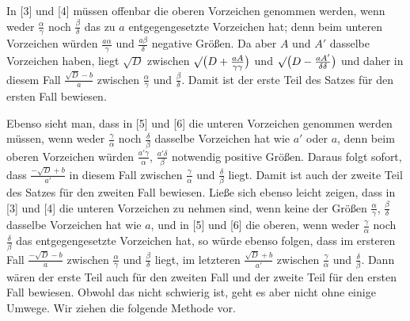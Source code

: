 In [3] und [4] müssen offenbar die oberen Vorzeichen genommen werden, wenn weder $\frac{\alpha}{\gamma}$ noch $\frac{\beta}{\delta}$ das zu $a$ entgegengesetzte Vorzeichen hat; denn beim unteren Vorzeichen würden $\frac{a\alpha}{\gamma}$ und $\frac{a\beta}{\delta}$ negative Größen. Da aber $A$ und $A'$ dasselbe Vorzeichen haben, liegt $\surd D$ zwischen $\surd\bigl(D+\frac{aA}{\gamma\gamma}\bigr)$ und $\surd\bigl(D-\frac{aA'}{\delta\delta}\bigr)$ und daher in diesem Fall $\frac{\surd D-b}{a}$ zwischen $\frac{\alpha}{\gamma}$ und $\frac{\beta}{\delta}$. Damit ist der erste Teil des Satzes für den ersten Fall bewiesen.

Ebenso sieht man, dass in [5] und [6] die unteren Vorzeichen genommen werden müssen, wenn weder $\frac{\gamma}{\alpha}$ noch $\frac{\delta}{\beta}$ dasselbe Vorzeichen hat wie $a'$ oder $a$, denn beim oberen Vorzeichen würden $\frac{a'\gamma}{\alpha}$, $\frac{a'\delta}{\beta}$ notwendig positive Größen. Daraus folgt sofort, dass $\frac{-\surd D+b}{a'}$ in diesem Fall zwischen $\frac{\gamma}{\alpha}$ und $\frac{\delta}{\beta}$ liegt. Damit ist auch der zweite Teil des Satzes für den zweiten Fall bewiesen. Ließe sich ebenso leicht zeigen, dass in [3] und [4] die unteren Vorzeichen zu nehmen sind, wenn keine der Größen $\frac{\alpha}{\gamma}$, $\frac{\beta}{\delta}$ dasselbe Vorzeichen hat wie $a$, und in [5] und [6] die oberen, wenn weder $\frac{\gamma}{\alpha}$ noch $\frac{\delta}{\beta}$ das entgegengesetzte Vorzeichen hat, so würde ebenso folgen, dass im ersteren Fall $\frac{-\surd D-b}{a}$ zwischen $\frac{\alpha}{\gamma}$ und $\frac{\beta}{\delta}$ liegt, im letzteren $\frac{\surd D+b}{a'}$ zwischen $\frac{\gamma}{\alpha}$ und $\frac{\delta}{\beta}$. Dann wären der erste Teil auch für den zweiten Fall und der zweite Teil für den ersten Fall bewiesen. Obwohl das nicht schwierig ist, geht es aber nicht ohne einige Umwege. Wir ziehen die folgende Methode vor.

